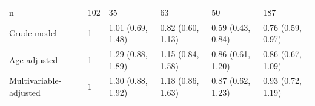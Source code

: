 \documentclass[]{tufte-handout}
\begin{document}
\begin{table}[!htbp]
\begin{tabular}[t]{llllll}
\rowcolor{gray!6}  \hspace{1em}n & 102 & 35 & 63 & 50 & 187\\
\hspace{1em}Crude model & 1 & 1.01 (0.69, 1.48) & 0.82 (0.60, 1.13) & 0.59 (0.43, 0.84) & 0.76 (0.59, 0.97)\\
\rowcolor{gray!6}  \hspace{1em}Age-adjusted & 1 & 1.29 (0.88, 1.89) & 1.15 (0.84, 1.58) & 0.86 (0.61, 1.20) & 0.86 (0.67, 1.09)\\
\hspace{1em}Multivariable-adjusted & 1 & 1.30 (0.88, 1.92) & 1.18 (0.86, 1.63) & 0.87 (0.62, 1.23) & 0.93 (0.72, 1.19)\\
\bottomrule
\end{tabular}
\end{table}


\end{document}
